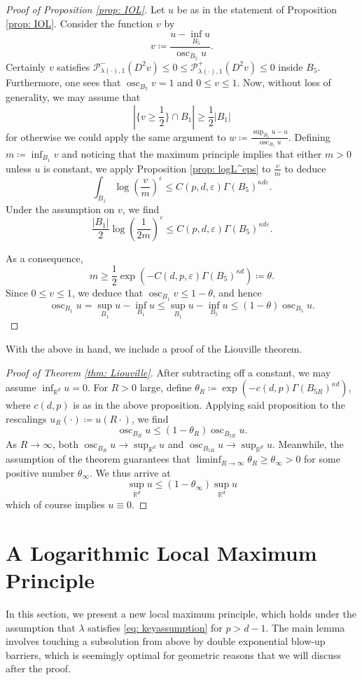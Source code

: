 \documentclass[reqno]{amsart}
\numberwithin{equation}{section}
\numberwithin{equation}{section}
\newcommand{\R}{\mathbb R}
\newcommand{\eps}{\varepsilon}
\newcommand{\ds}{\displaystyle}
\DeclareMathOperator*{\osc}{osc}
\begin{document}
\begin{proof}[Proof of Proposition \ref{prop: IOL}]
Let $u$ be as in the statement of Proposition \ref{prop: IOL}. Consider the function $v$ by 
$$v \coloneqq \frac{u - \inf_{B_5} u}{\osc_{B_5}u}.$$
Certainly $v$ satisfies $\mathcal{P}^-_{\lambda(\cdot),1}(D^2v)\le 0 \le\mathcal{P}^+_{\lambda(\cdot),1}(D^2v)\le 0$ inside $B_5$. Furthermore, one sees that $\ds \osc_{B_5} v =1$ and $0\le v \le 1$. Now, without loss of generality, we may assume that 
$$|\{v\ge \ds \frac12\} \cap B_1| \ge \frac12 |B_1|$$
for otherwise we could apply the same argument to $w \coloneqq \ds \frac{\sup_{B_5} u - u}{\osc_{B_5} u}.$ Defining $m\ds \coloneqq \inf_{B_1}v$ and noticing that the maximum principle implies that either $m>0$ unless $u$ is constant, we apply Proposition \ref{prop: logL^eps} to $\ds \frac{v}{m}$ to deduce
$$\int_{B_1} \log\left(\frac{v}{m}\right)^\eps \le C(p,d,\eps) \Gamma(B_5)^{\kappa d \eps}.$$
Under the assumption on $v$, we find
$$\frac{|B_1|}{2} \log\left(\frac{1}{2m}\right) ^\eps\le C(p,d,\eps) \Gamma(B_5)^{\kappa d \eps}.$$

As a consequence,
$$m \ge \frac12 \exp\left(-C(d,p,\eps)\Gamma(B_5)^{\kappa d}\right) \coloneqq \theta.$$
Since $0\le v \le 1$, we deduce that $\osc_{B_1}v \le 1-\theta$, and hence
$$\osc_{B_1}u = \sup_{B_1} u - \inf_{B_1} u \le \sup_{B_1} u - \inf_{B_5} u \le (1-\theta) \osc_{B_5}u.$$
\end{proof}
With the above in hand, we include a proof of the Liouville theorem.
\begin{proof}[Proof of Theorem \ref{thm: Liouville}]
After subtracting off a constant, we may assume $\ds \inf_{\R^d} u =0$. For $R>0$ large, define $\theta_R \coloneqq \exp(-c(d,p)\Gamma(B_{5R})^{\kappa d})$, where $c(d,p)$ is as in the above proposition. Applying said proposition to the rescalings $u_R(\cdot) \coloneqq u(R  \cdot)$, we find
$$\osc_{B_R} u \le (1-\theta_R) \osc_{B_{5R}}u.$$
As $R \to \infty$, both $\ds \osc_{B_R}u\to \sup_{\R^d} u$ and $\ds \osc_{B_{5R}}u \to \sup_{\R^d} u$. Meanwhile, the assumption of the theorem guarantees that $\ds \liminf_{R\to \infty} \theta_R \ge \theta_\infty>0$ for some positive number $\theta_\infty$. We thus arrive at 
$$\sup_{\R^d} u \le (1-\theta_\infty) \sup_{\R^d}u$$
which of course implies $u\equiv 0$. 
\end{proof}
\section{A Logarithmic Local Maximum Principle}
\label{sec: LMP}
In this section, we present a new local maximum principle, which holds under the assumption that $\lambda$ satisfies \eqref{eq: keyassumption} for $p>d-1$. The main lemma involves touching a subsolution from above by double exponential blow-up barriers, which is seemingly optimal for geometric reasons that we will discuss after the proof. 
\end{document}
